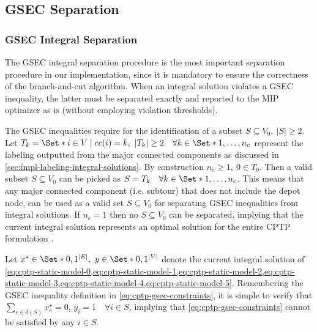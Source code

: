 \subsection{GSEC Separation}
\label{sec:impl-gsec-separation}

\subsubsection{GSEC Integral Separation}
\label{sec:impl-gsec-integral-separation}

The GSEC integral separation procedure is the most important
separation procedure in our implementation,
since it is mandatory to ensure the correctness of the branch-and-cut algorithm.
When an integral solution violates a GSEC inequality,
the latter must be separated exactly and reported to the MIP optimizer as is
(without employing violation thresholds).

The GSEC inequalities require for the identification of a subset $S \subseteq V_0,\ |S| \ge 2$.
Let $T_k  = \Set*{i \in V \mid cc(i) = k},\ |T_k| \ge 2 \quad \forall k \in \Set*{1, \dots, n_c}$
represent the labeling outputted from the major connected components
as discussed in \cref{sec:impl-labeling-integral-solutions}.
By construction $n_c \ge 1,\ 0 \in T_0$.
Then a valid subset $S \subseteq V_0$ can be picked as $S = T_k \quad \forall k \in \Set*{1, \dots, n_c}$.
This means that
any major connected component (i.e. subtour) that does not include the depot node,
can be used as a valid set $S \subseteq V_0$ for separating GSEC inequalities from integral solutions.
If $n_c = 1$ then no $S \subseteq V_0$ can be separated,
implying that the current integral solution represents an optimal solution for the entire CPTP formulation
.

Let $x^\star \in \Set*{0, 1}^{|E|},\ y \in \Set*{0, 1}^{|V|}$ denote the
current integral solution of
\cref{eq:cptp-static-model-0,eq:cptp-static-model-1,eq:cptp-static-model-2,eq:cptp-static-model-3,eq:cptp-static-model-4,eq:cptp-static-model-5}.
Remembering the GSEC inequality definition in \cref{eq:cptp-gsec-constraints},
it is simple to verify that
$\sum_{e \in \delta(S)} x^\star_{e} = 0$, $y_i =  1 \quad \forall i \in S$, implying that \cref{eq:cptp-gsec-constraints} cannot be satisfied by any $i \in S$.

